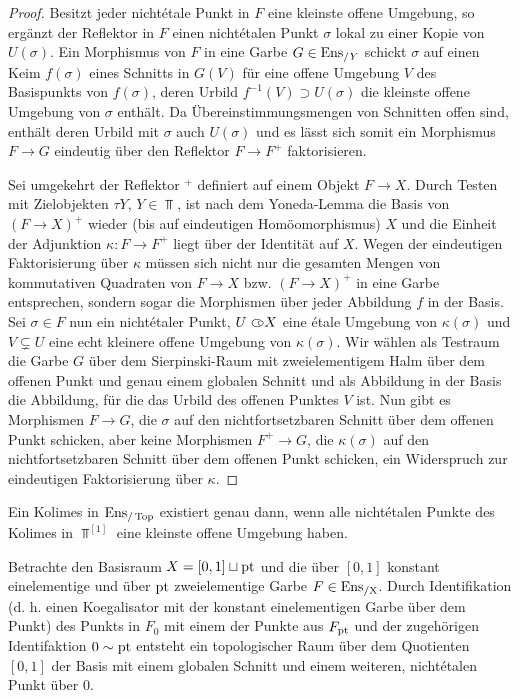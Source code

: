 \begin{proof}
  Besitzt jeder nichtétale Punkt in $F$ eine kleinste offene Umgebung,
  so ergänzt der Reflektor in $F$ einen nichtétalen Punkt $\sigma$
  lokal zu einer Kopie von $U(\sigma)$. Ein Morphismus von $F$ in eine
  Garbe $G \in \operatorname{Ens}_{/Y}$ schickt $\sigma$ auf einen Keim $f(\sigma)$
  eines Schnitts in $G(V)$ für eine offene Umgebung $V$ des
  Basispunkts von $f(\sigma)$, deren Urbild $f^{-1}(V) \supset
  U(\sigma)$ die kleinste offene Umgebung von $\sigma$ enthält. Da
  Übereinstimmungsmengen von Schnitten offen sind, enthält deren
  Urbild mit $\sigma$ auch $U(\sigma)$ und es lässt sich somit ein
  Morphismus $F \to G$ eindeutig über den Reflektor $F \to F^+$
  faktorisieren.
  
  Sei umgekehrt der Reflektor $^+$ definiert auf einem Objekt $F \to
  X$. Durch Testen mit Zielobjekten $\tau Y$, $Y \in \Top$, ist nach
  dem Yoneda-Lemma die Basis von $(F \to X)^+$ wieder (bis auf
  eindeutigen Homöomorphismus) $X$ und die Einheit der Adjunktion
  $\kappa: F \to F^+$ liegt über der Identität auf $X$. Wegen der
  eindeutigen Faktorisierung über $\kappa$ müssen sich nicht nur die
  gesamten Mengen von kommutativen Quadraten von $F \to X$ bzw. $(F
  \to X)^+$ in eine Garbe entsprechen, sondern sogar die Morphismen
  über jeder Abbildung $f$ in der Basis. Sei $\sigma \in F$ nun ein
  nichtétaler Punkt, $U \subset\kern-0.58em\circ X$ eine étale Umgebung von
  $\kappa(\sigma)$ und $V \subsetneq U$ eine echt kleinere offene
  Umgebung von $\kappa(\sigma)$. Wir wählen als Testraum die Garbe $G$
  über dem Sierpinski-Raum mit zweielementigem Halm über dem offenen
  Punkt und genau einem globalen Schnitt und als Abbildung in der
  Basis die Abbildung, für die das Urbild des offenen Punktes $V$
  ist. Nun gibt es Morphismen $F \to G$, die $\sigma$ auf den
  nichtfortsetzbaren Schnitt über dem offenen Punkt schicken, aber
  keine Morphismen $F^+ \to G$, die $\kappa(\sigma)$ auf den
  nichtfortsetzbaren Schnitt über dem offenen Punkt schicken, ein
  Widerspruch zur eindeutigen Faktorisierung über $\kappa$.
\end{proof}
\begin{kor} \label{enstop-coequalizers}
  Ein Kolimes in $\operatorname{Ens}_{/\operatorname{Top}}$ existiert genau dann, wenn alle nicht\-étalen
  Punkte des Kolimes in $\Top^{[1]}$ eine kleinste offene Umgebung
  haben.
\end{kor}
\begin{bsp}
  Betrachte den Basisraum $X = [0, 1] \sqcup \operatorname{pt}$ und die über $[0,
    1]$ konstant einelementige und über $\operatorname{pt}$ zweielementige Garbe
  $F \in \operatorname{Ens_{/X}}$. Durch Identifikation (d. h. einen Koegalisator mit
  der konstant einelementigen Garbe über dem Punkt) des Punkts in
  $F_0$ mit einem der Punkte aus $F_{\operatorname{pt}}$ und der zugehörigen
  Identifaktion $0 \sim \operatorname{pt}$ entsteht ein topologischer Raum über
  dem Quotienten $[0, 1]$ der Basis mit einem globalen Schnitt und
  einem weiteren, nichtétalen Punkt über $0$.
\end{bsp}

